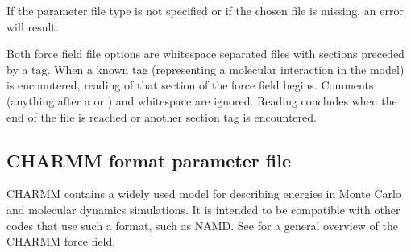 \documentclass[letterpaper,10pt,english]{sphinxmanual}
\begin{document}
\sphinxAtStartPar
If the parameter file type is not specified or if the chosen file is missing, an error will result.

\sphinxAtStartPar
Both force field file options are whitespace separated files with sections preceded by a tag. When a known tag (representing a molecular interaction in the model) is encountered, reading of that section of the force field begins. Comments (anything after a \sphinxcode{\sphinxupquote{*}} or \sphinxcode{\sphinxupquote{!}}) and whitespace are ignored. Reading concludes when the end of the file is reached or another section tag is encountered.


\subsection{CHARMM format parameter file}
\label{\detokenize{input_file:charmm-format-parameter-file}}
\sphinxAtStartPar
CHARMM contains a widely used model for describing energies in Monte Carlo and molecular dynamics simulations. It is intended to be compatible with other codes that use such a format, such as NAMD. See  for a general overview of the CHARMM force field.
\end{document}
